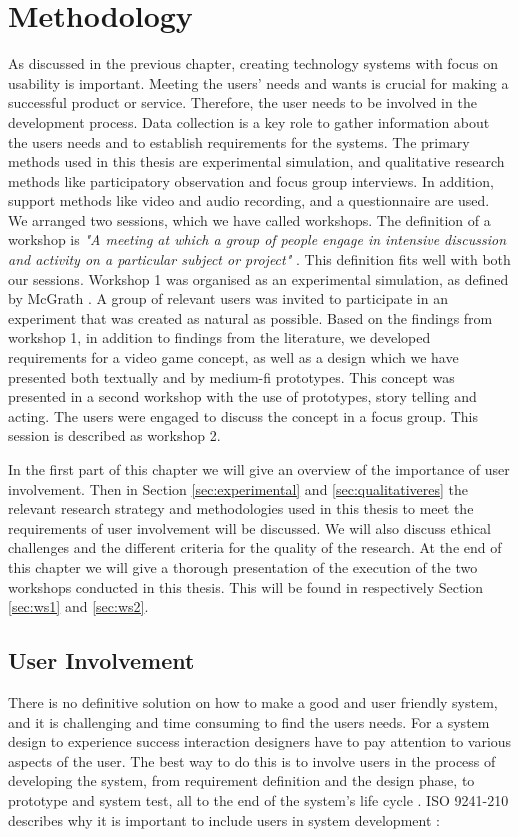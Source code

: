 \chapter{Methodology}
\label{chap:metode}
As discussed in the previous chapter, creating technology systems with focus on usability is important. Meeting the users' needs and wants is crucial for making a successful product or service. Therefore, the user needs to be involved in the development process. Data collection is a key role to gather information about the users needs and to establish requirements for the systems. The primary methods used in this thesis are experimental simulation, and qualitative research methods like participatory observation and focus group interviews. In addition, support methods like video and audio recording, and a questionnaire are used. We arranged two sessions, which we have called workshops.  The definition of a workshop is \emph{"A meeting at which a group of people engage in intensive discussion and activity on a particular subject or project"} \cite{dictionary}. This definition fits well with both our sessions. Workshop 1 was organised as an experimental simulation, as defined by McGrath \cite{McGrath}. A group of relevant users was invited to participate in an experiment that was created as natural as possible. Based on the findings from workshop 1, in addition to findings from the literature, we developed requirements for a video game concept, as well as a design which we have presented both textually and by medium-fi prototypes. This concept was presented in a second workshop with the use of prototypes, story telling and acting. The users were engaged to discuss the concept in a focus group. This session is described as workshop 2.

In the first part of this chapter we will give an overview of the importance of user involvement. Then in Section \ref{sec:experimental} and \ref{sec:qualitativeres} the relevant research strategy and methodologies used in this thesis to meet the requirements of user involvement will be discussed. We will also discuss ethical challenges and the different criteria for the quality of the research. At the end of this chapter we will give a thorough presentation of the execution of the two workshops conducted in this thesis. This will be found in respectively Section \ref{sec:ws1} and \ref{sec:ws2}.

\section{User Involvement}
\label{sec:userinvolvement}
There is no definitive solution on how to make a good and user friendly system, and it is challenging and time consuming to find the users needs. For a system design to experience success interaction designers have to pay attention to various aspects of the user. The best way to do this is to involve users in the process of developing the system, from requirement definition and the design phase, to prototype and system test, all to the end of the system's life cycle \cite{mmi}. ISO 9241-210 describes why it is important to include users in system development \cite{dis20109241}:

